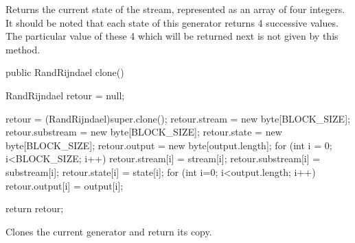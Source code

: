 \begin{tabb} Returns the current state of the stream, represented as an
  array of four integers.
  It should be noted that each state of this generator returns 4 successive
  values. The particular value of these 4 which will be returned next is not
  given by this method.
\end{tabb}
\begin{htmlonly}
\end{htmlonly}
\begin{code}

   public RandRijndael clone() \begin{hide} {
      RandRijndael retour = null;

      retour = (RandRijndael)super.clone();
      retour.stream = new byte[BLOCK_SIZE];
      retour.substream = new byte[BLOCK_SIZE];
      retour.state = new byte[BLOCK_SIZE];
      retour.output = new byte[output.length];
      for (int i = 0; i<BLOCK_SIZE; i++) {
         retour.stream[i] = stream[i];
         retour.substream[i] = substream[i];
         retour.state[i] = state[i];
      }
      for (int i=0; i<output.length; i++) {
         retour.output[i] = output[i];
      }

      return retour;
   }\end{hide}
\end{code}
 \begin{tabb} Clones the current generator and return its copy.
 \end{tabb}
 \begin{htmlonly}
\end{htmlonly}
